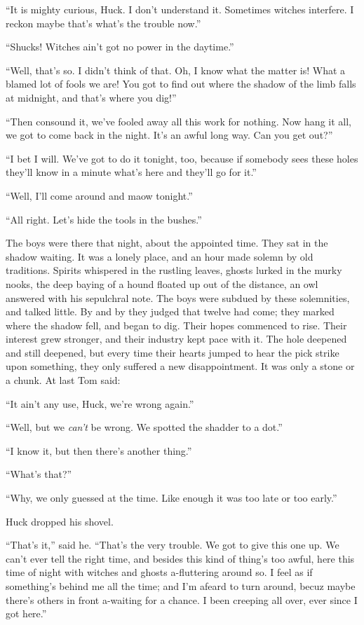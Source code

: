 \documentclass{book}
\begin{document}
“It is mighty curious, Huck. I don’t understand it. Sometimes witches interfere. I reckon maybe that’s what’s the trouble now.”

“Shucks! Witches ain’t got no power in the daytime.”

“Well, that’s so. I didn’t think of that. Oh, I know what the matter is! What a blamed lot of fools we are! You got to find out where the shadow of the limb falls at midnight, and that’s where you dig!”

“Then consound it, we’ve fooled away all this work for nothing. Now hang it all, we got to come back in the night. It’s an awful long way. Can you get out?”

“I bet I will. We’ve got to do it tonight, too, because if somebody sees these holes they’ll know in a minute what’s here and they’ll go for it.”

“Well, I’ll come around and maow tonight.”

“All right. Let’s hide the tools in the bushes.”

The boys were there that night, about the appointed time. They sat in the shadow waiting. It was a lonely place, and an hour made solemn by old traditions. Spirits whispered in the rustling leaves, ghosts lurked in the murky nooks, the deep baying of a hound floated up out of the distance, an owl answered with his sepulchral note. The boys were subdued by these solemnities, and talked little. By and by they judged that twelve had come; they marked where the shadow fell, and began to dig. Their hopes commenced to rise. Their interest grew stronger, and their industry kept pace with it. The hole deepened and still deepened, but every time their hearts jumped to hear the pick strike upon something, they only suffered a new disappointment. It was only a stone or a chunk. At last Tom said:

“It ain’t any use, Huck, we’re wrong again.”

“Well, but we \emph{can’t} be wrong. We spotted the shadder to a dot.”

“I know it, but then there’s another thing.”

“What’s that?”

“Why, we only guessed at the time. Like enough it was too late or too early.”

Huck dropped his shovel.

“That’s it,” said he. “That’s the very trouble. We got to give this one up. We can’t ever tell the right time, and besides this kind of thing’s too awful, here this time of night with witches and ghosts a-fluttering around so. I feel as if something’s behind me all the time; and I’m afeard to turn around, becuz maybe there’s others in front a-waiting for a chance. I been creeping all over, ever since I got here.”
\end{document}
